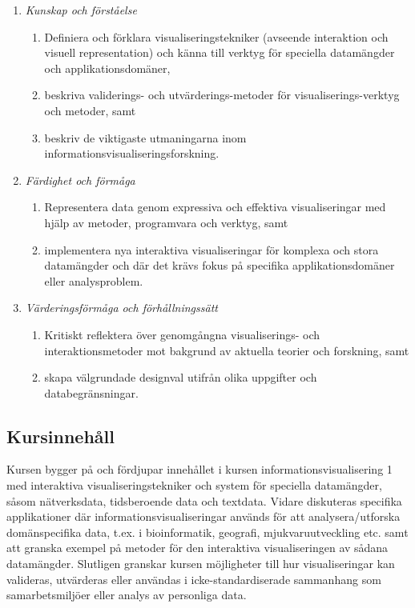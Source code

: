 \begin{enumerate}
\def\labelenumi{\Alph{enumi}.}
\tightlist
\item
  \emph{Kunskap och förståelse}

  \begin{enumerate}
  \def\labelenumii{\Alph{enumi}.\arabic{enumii}.}
  \tightlist
  \item
    Definiera och förklara visualiseringstekniker (avseende interaktion
    och visuell representation) och känna till verktyg för speciella
    datamängder och applikationsdomäner,
  \item
    beskriva validerings- och utvärderings-metoder för
    visualiserings-verktyg och metoder, samt
  \item
    beskriv de viktigaste utmaningarna inom
    informationsvisualiseringsforskning.
  \end{enumerate}
\item
  \emph{Färdighet och förmåga}

  \begin{enumerate}
  \def\labelenumii{\Alph{enumi}.\arabic{enumii}.}
  \tightlist
  \item
    Representera data genom expressiva och effektiva visualiseringar med
    hjälp av metoder, programvara och verktyg, samt
  \item
    implementera nya interaktiva visualiseringar för komplexa och stora
    datamängder och där det krävs fokus på specifika applikationsdomäner
    eller analysproblem.
  \end{enumerate}
\item
  \emph{Värderingsförmåga och förhållningssätt}

  \begin{enumerate}
  \def\labelenumii{\Alph{enumi}.\arabic{enumii}.}
  \tightlist
  \item
    Kritiskt reflektera över genomgångna visualiserings- och
    interaktionsmetoder mot bakgrund av aktuella teorier och forskning,
    samt
  \item
    skapa välgrundade designval utifrån olika uppgifter och
    databegränsningar.
  \end{enumerate}
\end{enumerate}

\subsection*{Kursinnehåll}

Kursen bygger på och fördjupar innehållet i kursen
informationsvisualisering 1 med interaktiva visualiseringstekniker och
system för speciella datamängder, såsom nätverksdata, tidsberoende data
och textdata. Vidare diskuteras specifika applikationer där
informationsvisualiseringar används för att analysera/utforska
domänspecifika data, t.ex. i bioinformatik, geografi, mjukvaruutveckling
etc. samt att granska exempel på metoder för den interaktiva
visualiseringen av sådana datamängder. Slutligen granskar kursen
möjligheter till hur visualiseringar kan valideras, utvärderas eller
användas i icke-standardiserade sammanhang som samarbetsmiljöer eller
analys av personliga data.

